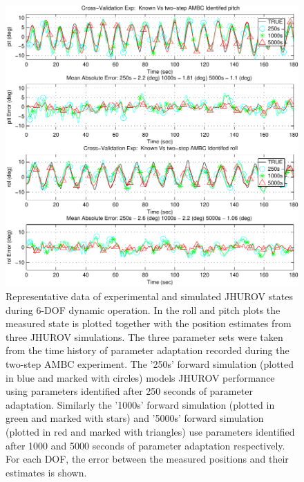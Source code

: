 \begin{center}
\begin{figure}[htbp]
  \begin{center}
    \includegraphics[width=150mm]{./chUV_AMBC/images/OLO_angPos}
  \end{center}
  \caption{ Representative data of experimental and simulated
    \ac{JHUROV} states during 6-\ac{DOF} dynamic operation.  In the
    roll and pitch plots the measured state is plotted together with
    the position estimates from three \ac{JHUROV} simulations. The
    three parameter sets were taken from the time history of parameter
    adaptation recorded during the two-step \ac{AMBC} experiment.  The
    '250s' forward simulation (plotted in blue and marked with
    circles) models \ac{JHUROV} performance using parameters
    identified after 250 seconds of parameter adaptation.  Similarly
    the '1000s' forward simulation (plotted in green and marked with
    stars) and '5000s' forward simulation (plotted in red and marked
    with triangles) use parameters identified after 1000 and 5000
    seconds of parameter adaptation respectively.  For each \ac{DOF},
    the error between the measured positions and their estimates is
    shown.  }
  \label{chUV_AMBC.fig.posOLO}
\end{figure}
\end{center}

